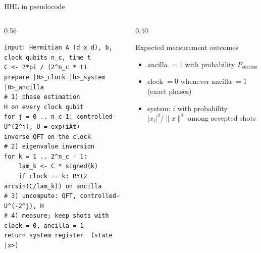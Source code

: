 \documentclass[aspectratio=169,11pt]{beamer}
\begin{document}
\begin{frame}[fragile]{HHL in pseudocode}
  \begin{columns}[T]
    \begin{column}{0.56\textwidth}
\begin{lstlisting}[language={},basicstyle=\ttfamily\tiny]
input: Hermitian A (d x d), b, clock qubits n_c, time t
C <- 2*pi / (2^n_c * t)
prepare |0>_clock |b>_system |0>_ancilla
# 1) phase estimation
H on every clock qubit
for j = 0 .. n_c-1: controlled-U^(2^j), U = exp(iAt)
inverse QFT on the clock
# 2) eigenvalue inversion
for k = 1 .. 2^n_c - 1:
    lam_k <- C * signed(k)
    if clock == k: RY(2 arcsin(C/lam_k)) on ancilla
# 3) uncompute: QFT, controlled-U^(-2^j), H
# 4) measure; keep shots with clock = 0, ancilla = 1
return system register  (state |x>)
\end{lstlisting}
    \end{column}
    \begin{column}{0.40\textwidth}
      \begin{block}{Expected measurement outcomes}
        \small
        \begin{itemize}
          \item ancilla $= 1$ with probability $P_{\text{success}}$
          \item clock $= 0$ whenever ancilla $= 1$ (exact phases)
          \item system: $i$ with probability $|x_i|^2/\|x\|^2$ among accepted shots
        \end{itemize}
      \end{block}
    \end{column}
  \end{columns}
\end{frame}

\end{document}
